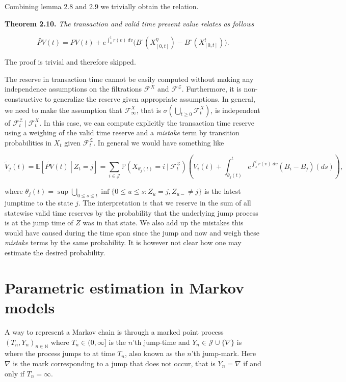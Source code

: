 \documentclass[a4paper,10pt,openany]{book}
\begin{document}
Combining lemma 2.8 and 2.9 we trivially obtain the relation.

\textbf{Theorem 2.10.} \emph{The transaction and valid time present value relates as follows}

\[
\tilde{PV}(t)=PV(t) +e^{\int_0^t r(v)\ dv}\Big(B^\circ(X^\eta_{[0,t]})-B^\circ(X^t_{[0,t]})\Big).
\]

The proof is trivial and therefore skipped.

The reserve in transaction time cannot be easily computed without making any independence assumptions on the filtrations \(\mathcal F^X\) and \(\mathcal F^{\mathcal Z}\). Furthermore, it is non-constructive to generalize the reserve given appropriate assumptions. In general, we need to make the assumption that \(\mathcal F^X_\infty\), that is \(\sigma\left(\bigcup_{t\ge 0} \mathcal F^X_t\right)\), is independent of \(\mathcal F^{\mathcal Z}_t\ \vert\ \mathcal F^X_t\). In this case, we can compute explicitly the transaction time reserve using a weighing of the valid time reserve and a \emph{mistake} term by transition probabilities in \(X_t\) given \(\mathcal F^{\mathcal Z}_t\). In general we would have something like

\[
\tilde V_{j}(t)=\mathbb E\left[\left.\tilde {PV}(t)\ \right\vert\ Z_t= j\right]=\sum_{i\in \mathcal J}\mathbb P(X_{\theta_j(t)}=i\ \vert\ \mathcal F^{\mathcal Z}_t)\left(V_i(t)+\int_{\theta_j(t)}^t e^{\int_s^t r(v)\ dv}(B_i-B_j)(ds)\right),
\]

where \(\theta_j(t)=\sup\bigcup_{0\le s\le t}\inf\{0\le u\le s: Z_u=j, Z_{u-}\ne j\}\) is the latest jumptime to the state \(j\). The interpretation is that we reserve in the sum of all statewise valid time reserves by the probability that the underlying jump process is at the jump time of \(Z\) was in that state. We also add up the mistakes this would have caused during the time span since the jump and now and weigh these \emph{mistake} terms by the same probability. It is however not clear how one may estimate the desired probability.

\hypertarget{parametric-estimation-in-markov-models}{%
\section{Parametric estimation in Markov models}\label{parametric-estimation-in-markov-models}}

A way to represent a Markov chain is through a marked point process \((T_n,Y_n)_{n\in\mathbb N}\) where \(T_n \in (0, \infty]\) is the \(n\)'th jump-time and \(Y_n \in \mathcal J \cup \{\nabla\}\) is where the process jumps to at time \(T_n\), also known as the \(n\)'th jump-mark. Here \(\nabla\) is the mark corresponding to a jump that does not occur, that is \(Y_n =\nabla\) if and only if \(T_n =\infty\).
\end{document}

